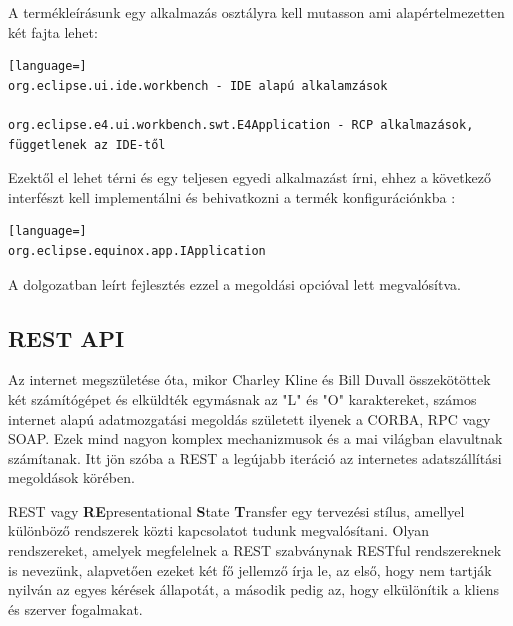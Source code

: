 A termékleírásunk egy alkalmazás osztályra kell mutasson ami alapértelmezetten két fajta lehet:

\begin{lstlisting}[language=]
org.eclipse.ui.ide.workbench - IDE alapú alkalamzások

org.eclipse.e4.ui.workbench.swt.E4Application - RCP alkalmazások, függetlenek az IDE-től
\end{lstlisting}

Ezektől el lehet térni és egy teljesen egyedi alkalmazást írni, ehhez a következő interfészt kell implementálni és behivatkozni a termék konfigurációnkba :

\begin{lstlisting}[language=]
org.eclipse.equinox.app.IApplication
\end{lstlisting}

A dolgozatban leírt fejlesztés ezzel a megoldási opcióval lett megvalósítva.

\subsection{REST API}

Az internet megszületése óta, mikor Charley Kline és Bill Duvall összekötöttek két számítógépet és elküldték egymásnak az "L" és "O" karaktereket, számos internet alapú adatmozgatási megoldás született ilyenek a CORBA, RPC vagy SOAP. Ezek mind nagyon komplex mechanizmusok és a mai világban elavultnak számítanak. Itt jön szóba a REST a legújabb iteráció az internetes adatszállítási megoldások körében. \cite{rest_history}

REST vagy \textbf{RE}presentational \textbf{S}tate \textbf{T}ransfer egy tervezési stílus, amellyel különböző rendszerek közti kapcsolatot tudunk megvalósítani. Olyan rendszereket, amelyek megfelelnek a REST szabványnak RESTful rendszereknek is nevezünk, alapvetően ezeket két fő jellemző írja le, az első, hogy nem tartják nyilván az egyes kérések állapotát, a második pedig az, hogy elkülönítik a kliens és szerver fogalmakat. 

